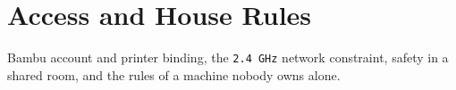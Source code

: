
\chapter{Access and House Rules}

 Bambu account and printer binding, the
\texttt{2.4~GHz} network constraint, safety in a shared room, and the rules of a
machine nobody owns alone.

